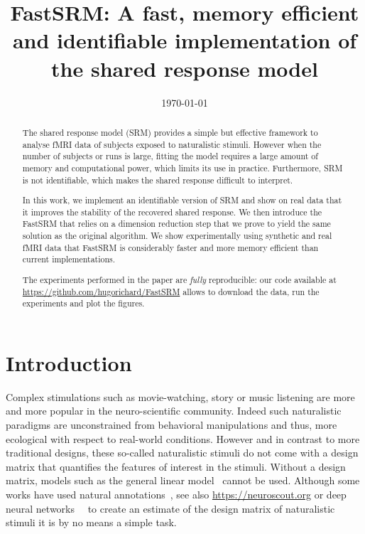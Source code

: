 \documentclass{article}
\title{FastSRM: A fast, memory efficient and identifiable implementation of the
  shared response model}
\date{\today} %
\newcommand{\bt}[1]{\todo[color=orange, inline=True]{BT: #1}}
\begin{document}
\maketitle

\begin{abstract}
  The shared response model (SRM) provides a simple but effective framework to analyse
  fMRI data of subjects exposed to naturalistic stimuli.
  However when the number
  of subjects or runs is large,
  fitting the model requires a large amount of memory
and computational power, which limits its use in practice.
%
Furthermore, SRM is
not identifiable, which makes the shared response difficult to interpret.


In this work, we implement an identifiable version of SRM and show on real data
that it improves the stability of the recovered shared response.
%
We then introduce the FastSRM that relies on a dimension reduction step that we
prove to yield the same solution as the original algorithm.
%
We show experimentally using synthetic and real fMRI data
that FastSRM is considerably faster and more memory efficient
than current implementations.


The experiments performed in the paper are \emph{fully} reproducible: our
code available at \url{https://github.com/hugorichard/FastSRM} allows to download the
data, run the experiments and plot the figures.
%

\end{abstract}

\section{Introduction}
%
Complex stimulations such as movie-watching, story or music listening are more
and more popular in the neuro-scientific community. Indeed such naturalistic
paradigms are unconstrained from behavioral manipulations and thus, more
ecological with respect to real-world conditions.
%
However and in contrast to more traditional designs, these so-called
naturalistic stimuli do not come with a design matrix that quantifies the
features of interest in the stimuli.
%
Without a design matrix, models such as the general linear
model~\cite{poline2012general} cannot be used. Although some works have used
natural annotations~\cite{huth2012continuous}, see also \url{https://neuroscout.org} or deep neural
networks~\cite{gucclu2017increasingly}~\cite{richard2018optimizing} to create an
estimate of the design matrix of naturalistic
stimuli it is by no means a simple task.
\end{document}
